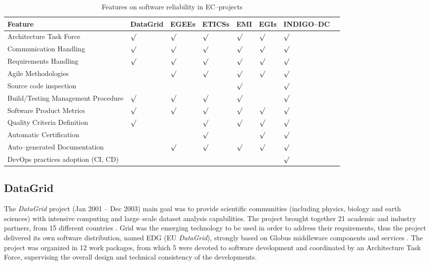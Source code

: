 \begin{table}[!h]
\renewcommand{\arraystretch}{1.3}
\caption{Features on software reliability in EC--projects}
\label{tab:feat}
\centering
\begin{tabular}{p{2.6cm}lllllll}
\hline
\hline
Feature & DataGrid & EGEEs & ETICSs & EMI & EGIs & INDIGO--DC\\
\hline
\hline
Architecture Task Force            &$\surd$&$\surd$&$\surd$&$\surd$&$\surd$&$\surd$\\
Communication Handling             &$\surd$&$\surd$&$\surd$&$\surd$&$\surd$&$\surd$\\
Requirements Handling              &$\surd$&$\surd$&$\surd$&$\surd$&$\surd$&$\surd$\\
Agile Methodologies                &       &$\surd$&$\surd$&$\surd$&$\surd$&$\surd$\\
Source code inspection             &       &       &       &$\surd$&       &$\surd$\\
Build/Testing Management Procedure &$\surd$&$\surd$&$\surd$&$\surd$&       &$\surd$\\
Software Product Metrics           &$\surd$&$\surd$&$\surd$&$\surd$&$\surd$&$\surd$\\
Quality Criteria Definition        &$\surd$&       &$\surd$&$\surd$&$\surd$&$\surd$\\
Automatic Certification            &       &       &$\surd$&       &$\surd$&$\surd$\\
Auto--generated Documentation      &       &$\surd$&$\surd$&$\surd$&$\surd$&$\surd$\\
DevOps practices adoption (CI, CD) &       &       &       &       &       &$\surd$\\
\hline
\hline
\end{tabular}
\end{table}

\subsection{DataGrid}

The {\sl DataGrid} \cite{cordis:datagrid} project (Jan 2001 -- Dec 2003)
main goal was to provide scientific communities (including physics, biology and
earth sciences) with intensive computing and large--scale dataset analysis capabilities.
The project brought together 21 academic and industry partners, from 15 different countries \cite{gagliardi}.
Grid was the emerging technology to be used in order to address their requirements,
thus the project delivered its own software distribution, named EDG (EU {\sl DataGrid}), strongly
based on Globus middleware components and services \cite{globus}. The project was organized in 12 work packages, from
which 5 were devoted to software development and coordinated by an
Architecture Task Force, supervising the overall design and technical consistency
of the developments.

